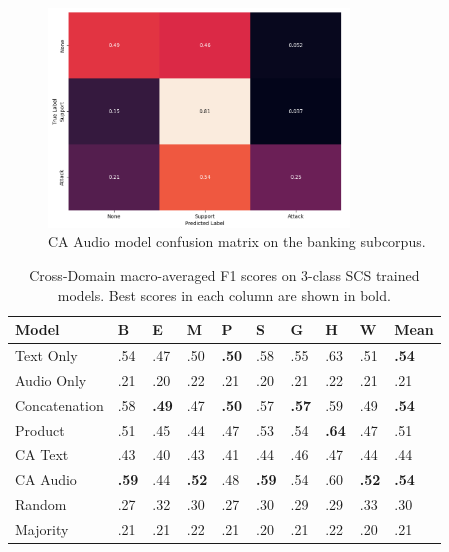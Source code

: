 \documentclass[twocolumn]{article}
\begin{document}
\begin{figure}[H]
\centering
\includegraphics[width=8cm]{ca-audio-conf-mat-3class-banking}
\caption{CA Audio model confusion matrix on the banking subcorpus.\label{fig:res-cd-ca-banking-3}}
\end{figure}

\begin{table}[t]
\centering
\caption{Cross-Domain macro-averaged F1 scores on 3-class SCS trained models. Best scores in each column are shown in bold. \label{tbl:cross-3-SCS}}
\begin{tabular}{|l|llllllll|l|}
\hline
Model         & B            & E            & M            & P            & S            & G            & H            & W            & Mean  \\ \hline
Text Only     & .54          & .47          & .50          & \textbf{.50} & .58          & .55          & .63          & .51          & \textbf{.54} \\
Audio Only    & .21          & .20          & .22          & .21          & .20          & .21          & .22          & .21          & .21           \\ \hline
Concatenation & .58          & \textbf{.49} & .47          & \textbf{.50} & .57          & \textbf{.57} & .59          & .49          & \textbf{.54} \\
Product       & .51          & .45          & .44          & .47          & .53          & .54          & \textbf{.64} & .47          & .51          \\
CA Text       & .43          & .40          & .43          & .41          & .44          & .46          & .47          & .44          & .44          \\
CA Audio      & \textbf{.59} & .44          & \textbf{.52} & .48          & \textbf{.59} & .54          & .60          & \textbf{.52} & \textbf{.54} \\ \hline
Random        & .27          & .32          & .30          & .27          & .30          & .29          & .29          & .33          & .30          \\
Majority      & .21          & .21          & .22          & .21          & .20          & .21          & .22          & .20          & .21           \\ \hline
\end{tabular}
\end{table}
\end{document}
